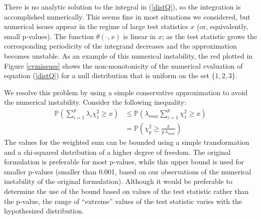 There is no analytic solution to the integral in (\ref{distQ}), 
so the integration is
accomplished numerically. This seems fine in most situations we considered,
but numerical issues appear in the regime of large test statistics $x$
(or, equivalently, small p-values).
The function $\theta(\cdot, x)$ is linear in $x$; as the test statistic 
grows the corresponding periodicity of the integrand decreases and
the approximation becomes unstable. 
As an example of this numerical instability, the red plotted in
Figure \ref{cvmissues} shows the non-monotonicity of the numerical
evaluation of equation (\ref{distQ}) for a null distribution that is
uniform on the set $\{1,2,3\}$.


We resolve this problem by using a simple conservative approximation to
avoid the numerical instability. Consider the
following inequality:
\begin{align}
\mathbb{P} \left(\sum_{i=1}^{p} \lambda_i \chi^2_1 \geq x \right) &\leq \mathbb{P} \left( \lambda_{max} \sum_{i=1}^{p} \chi^2_1 \geq x \right) \label{ineq1} \\
&= \mathbb{P} \left(\chi^2_p \geq \frac{x}{p \, \lambda_{max}} \right)
\label{ineq2}
\end{align}
The values for the weighted sum can be bounded using a simple transformation
and a chi-squared distribution of a higher degree of freedom. 
The original formulation is preferable for most p-values, while
this upper bound is used for smaller p-values (smaller than 0.001,
based on our observations of the numerical instability of the original
formulation).  Although it would be preferable to determine the use of
the bound based on values of the test statistic rather than the p-value,
the range of ``extreme'' values of the test statistic varies with the
hypothesized distribution.



